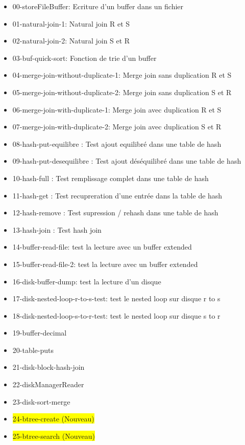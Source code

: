 \documentclass[a4paper]{article}
\begin{document}
\begin{itemize}
  \item 00-storeFileBuffer: Ecriture d'un buffer dans un fichier
  \item 01-natural-join-1: Natural join R et S
  \item 02-natural-join-2: Natural join S et R
  \item 03-buf-quick-sort: Fonction de trie d'un buffer
  \item 04-merge-join-without-duplicate-1: Merge join sans duplication R et S
  \item 05-merge-join-without-duplicate-2: Merge join sans duplication S et R
  \item 06-merge-join-with-duplicate-1: Merge join avec duplication R et S
  \item 07-merge-join-with-duplicate-2: Merge join avec duplication S et R
  \item 08-hash-put-equilibre : Test ajout equilibré dans une table de hash
  \item 09-hash-put-desequilibre : Test ajout déséquilibré dans une table de hash
  \item 10-hash-full : Test remplissage complet dans une table de hash
  \item 11-hash-get : Test recupreration d'une entrée dans la table de hash
  \item 12-hash-remove : Test supression / rehash dans une table de hash
  \item 13-hash-join : Test hash join
  \item 14-buffer-read-file: test la lecture avec un buffer extended
  \item 15-buffer-read-file-2: test la lecture avec un buffer extended
  \item 16-disk-buffer-dump: test la lecture d'un disque
  \item 17-disk-nested-loop-r-to-s-test: test le nested loop sur disque r to s
  \item 18-disk-nested-loop-s-to-r-test: test le nested loop sur disque s to r
  \item 19-buffer-decimal
  \item 20-table-puts
  \item 21-disk-block-hash-join
  \item 22-diskManagerReader
  \item 23-disk-sort-merge
  \item \colorbox{yellow}{24-btree-create (Nouveau)}
  \item \colorbox{yellow}{25-btree-search (Nouveau)}
\end{itemize}
\end{document}
